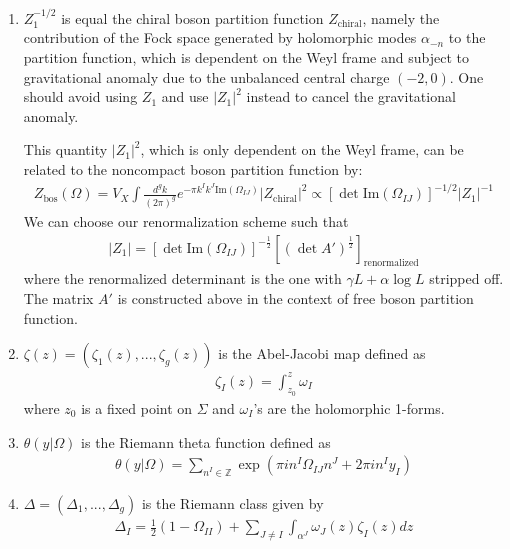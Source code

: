 \documentclass[12pt,letterpaper]{article}
\def\ie{\begin{equation}\begin{aligned}}
\def\fe{\end{aligned}\end{equation}}
\numberwithin{equation}{section}
\begin{document}
\begin{enumerate}
\item[$\bullet$] $Z_1^{-1/2}$ is equal the chiral boson partition function $Z_\text{chiral}$, namely the contribution of the Fock space generated by holomorphic modes $\alpha_{-n}$ to the partition function, which is dependent on the Weyl frame and subject to gravitational anomaly due to the unbalanced central charge $(-2,0)$. One should avoid using $Z_1$ and use $|Z_1|^2$ instead to cancel the gravitational anomaly. 

This quantity $|Z_1|^2$, which is only dependent on the Weyl frame, can be related to the noncompact boson partition function by:
\ie
Z_\text{bos}(\Omega) = V_X\int \frac{d^gk}{(2\pi)^g} e^{-\pi k^I k^J\mathrm{Im}(\Omega_{IJ})}|Z_\text{chiral}|^2 \propto \left[\det \mathrm{Im}(\Omega_{IJ})\right]^{-1/2}|Z_1|^{-1}
\fe
We can choose our renormalization scheme such that
\ie
|Z_1| = \left[\det \mathrm{Im}(\Omega_{IJ})\right]^{-\frac{1}{2}} [(\det A')^{\frac{1}{2}}]_\text{renormalized}
\fe
where the renormalized determinant is the one with $\gamma L+\alpha\log L$ stripped off. The matrix $A'$ is constructed above in the context of free boson partition function.

\item[$\bullet$] $\zeta(z)=(\zeta_1(z),...,\zeta_g(z))$ is the Abel-Jacobi map defined as
\ie
\zeta_I(z) = \int_{z_0}^z \omega_I
\fe
where $z_0$ is a fixed point on $\Sigma$ and $\omega_I$'s are the holomorphic 1-forms. 

\item[$\bullet$] $\theta(y|\Omega)$ is the Riemann theta function defined as
\ie
\theta(y|\Omega)=\sum_{n^I \in \mathbb{Z}} \exp \left(\pi in^I \Omega_{I J}n^J+2 \pi in^I y_I\right)
\fe

\item[$\bullet$] $\Delta=(\Delta_1,...,\Delta_g)$ is the Riemann class given by
\ie
\Delta_I = \frac{1}{2}(1-\Omega_{II}) + \sum_{J\neq I}\int_{\alpha^J} \omega_J(z)\zeta_I(z)dz
\fe


\end{enumerate}
\end{document}
